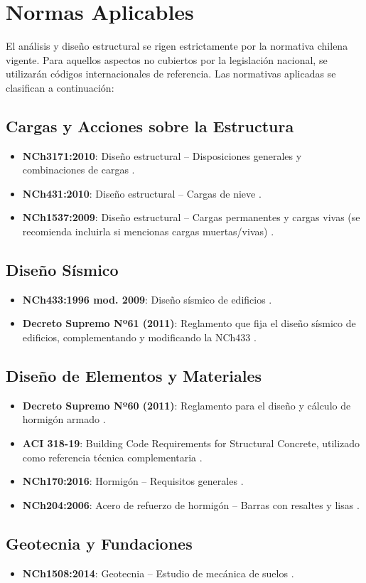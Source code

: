\section{Normas Aplicables}
El análisis y diseño estructural se rigen estrictamente por la normativa chilena vigente. Para aquellos aspectos no cubiertos por la legislación nacional, se utilizarán códigos internacionales de referencia. Las normativas aplicadas se clasifican a continuación:
  
\subsection{Cargas y Acciones sobre la Estructura}
\begin{itemize}
    \item \textbf{NCh3171:2010}: Diseño estructural -- Disposiciones generales y combinaciones de cargas \cite{NCh3171:2010}.
    \item \textbf{NCh431:2010}: Diseño estructural -- Cargas de nieve \cite{NCh431:2010}.
    \item \textbf{NCh1537:2009}: Diseño estructural -- Cargas permanentes y cargas vivas (se recomienda incluirla si mencionas cargas muertas/vivas) \cite{NCh1537:2009}.
\end{itemize}
   
\subsection{Diseño Sísmico}
\begin{itemize}
    \item \textbf{NCh433:1996 mod. 2009}: Diseño sísmico de edificios \cite{NCh433:1996}.
    \item \textbf{Decreto Supremo Nº61 (2011)}: Reglamento que fija el diseño sísmico de edificios, complementando y modificando la NCh433 \cite{DS61:2011}.
\end{itemize}

\subsection{Diseño de Elementos y Materiales}
\begin{itemize}
    \item \textbf{Decreto Supremo Nº60 (2011)}: Reglamento para el diseño y cálculo de hormigón armado \cite{DS60:2011}.
    \item \textbf{ACI 318-19}: Building Code Requirements for Structural Concrete, utilizado como referencia técnica complementaria \cite{ACI318:2019}.
    \item \textbf{NCh170:2016}: Hormigón -- Requisitos generales \cite{NCh170:2016}.
    \item \textbf{NCh204:2006}: Acero de refuerzo de hormigón -- Barras con resaltes y lisas \cite{NCh204:2006}.
\end{itemize}

\subsection{Geotecnia y Fundaciones}
\begin{itemize}
    \item \textbf{NCh1508:2014}: Geotecnia -- Estudio de mecánica de suelos \cite{NCh1508:2014}.
\end{itemize}